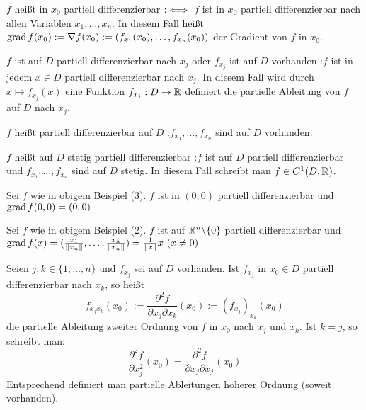 \documentclass[a4paper,twoside,DIV15,BCOR12mm]{scrbook}
\begin{document}
\def\grad{\mathop{\rm grad}\nolimits}
\begin{definition}
\begin{liste}
\item $f$ heißt in $x_0$ partiell differenzierbar $:\iff$ $f$ ist in $x_0$ partiell differenzierbar nach allen Variablen $x_1,\ldots, x_n$. In diesem Fall heißt $\grad f(x_0) := \nabla f(x_0) := (f_{x_1}(x_0),\ldots, f_{x_n}(x_0))$ der Gradient von $f$ in $x_0$. 
\item $f$ ist auf $D$ partiell differenzierbar nach $x_j$ oder $f_{x_j}$ ist auf $D$ vorhanden :\equizu $f$ ist in jedem $x\in D$ partiell differenzierbar nach $x_j$. In diesem Fall wird durch $x\mapsto f_{x_j}(x)$ eine Funktion $f_{x_j}: D\to \mathbb{R}$ definiert die partielle Ableitung von $f$ auf $D$ nach $x_j$.
\item $f$ heißt partiell differenzierbar auf $D$ :\equizu $f_{x_1},\ldots,f_{x_n}$ sind auf $D$ vorhanden.
\item $f$ heißt auf $D$ stetig partiell differenzierbar :\equizu $f$ ist auf $D$ partiell differenzierbar und $f_{x_1},\ldots,f_{x_n}$ sind auf $D$ stetig. In diesem Fall schreibt man $f\in C^1(D,\mathbb{R})$.
\end{liste}
\end{definition}

\begin{beispiele}
\item Sei $f$ wie in obigem Beispiel (3). $f$ ist in $(0,0)$ partiell differenzierbar und $\grad f(0,0) = (0,0)$
\item Sei $f$ wie in obigem Beispiel (2). $f$ ist auf $\mathbb{R}^n\backslash\{0\}$ partiell differenzierbar und $\grad f(x) = (\frac{x_1}{\|x_n\|},\ldots,\frac{x_n}{\|x_n\|}) = \frac{1}{\|x\|} x \ (x\ne 0)$
\end{beispiele}

\begin{definition}
Seien $j,k\in\{1,\ldots,n\}$ und $f_{x_j}$ sei auf $D$ vorhanden. Ist $f_{x_j}$ in $x_0\in D$ partiell differenzierbar nach $x_k$, so heißt $$f_{x_jx_k}(x_0) := \frac{\partial^2 f}{\partial x_j\partial x_k}(x_0) := \left(f_{x_j}\right)_{x_k}(x_0)$$ die partielle Ableitung zweiter Ordnung von $f$ in $x_0$ nach $x_j$ und $x_k$. Ist $k=j$, so schreibt man:
$$\frac{\partial^2 f}{\partial x_j^2}(x_0) = \frac{\partial^2 f}{\partial x_j\partial x_j}(x_0) $$ Entsprechend definiert man partielle Ableitungen höherer Ordnung (soweit vorhanden).
\end{definition}
\end{document}
